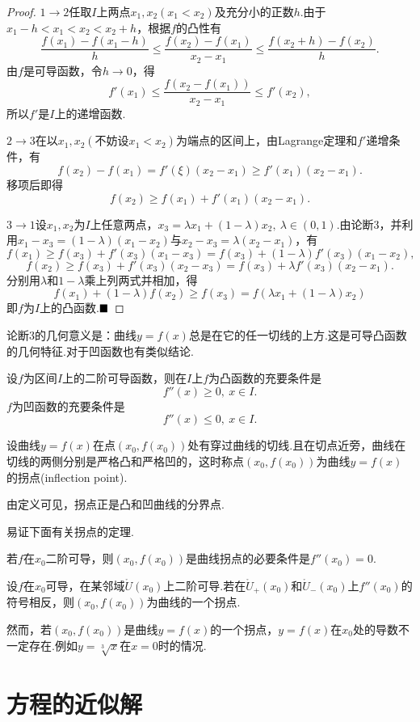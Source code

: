 \begin{proof}
	$1\to 2$\qquad 任取$I$上两点$x_1,x_2(x_1<x_2)$及充分小的正数$h$.由于$x_1-h<x_1<x_2<x_2+h$，根据$f$的凸性有
	$$\frac{f(x_1)-f(x_1-h)}{h}\leqslant\frac{f(x_2)-f(x_1)}{x_2-x_1}\leqslant\frac{f(x_2+h)-f(x_2)}{h}.$$
	由$f$是可导函数，令$h\to 0$，得
	$$f'(x_1)\leq\frac{f(x_2-f(x_1))}{x_2-x_1}\leqslant f'(x_2),$$
	所以$f'$是$I$上的递增函数.
	
	$2\to 3$\qquad 在以$x_1,x_2(\text{不妨设}x_1<x_2)$为端点的区间上，由Lagrange定理和$f'$递增条件，有
	$$f(x_2)-f(x_1)=f'(\xi)(x_2-x_1)\geqslant f'(x_1)(x_2-x_1).$$
	移项后即得
	$$f(x_2)\geqslant f(x_1)+f'(x_1)(x_2-x_1).$$
	
	$3\to 1$\qquad 设$x_1,x_2$为$I$上任意两点，$x_3=\lambda x_1+(1-\lambda)x_2,\ \lambda\in(0,1)$.由论断3，并利用$x_1-x_3=(1-\lambda)(x_1-x_2)$与$x_2-x_3=\lambda(x_2-x_1)$，有
	$$f(x_1)\geqslant f(x_3)+f'(x_3)(x_1-x_3)=f(x_3)+(1-\lambda)f'(x_3)(x_1-x_2),$$
	$$f(x_2)\geqslant f(x_3)+f'(x_3)(x_2-x_3)=f(x_3)+\lambda f'(x_3)(x_2-x_1).$$
	分别用$\lambda$和$1-\lambda$乘上列两式并相加，得
	$$f(x_1)+(1-\lambda)f(x_2)\geqslant f(x_3)=f(\lambda x_1+(1-\lambda)x_2)$$
	即$f$为$I$上的凸函数.$\hfill\blacksquare$
\end{proof}
\begin{remark}
	论断3的几何意义是：曲线$y=f(x)$总是在它的任一切线的上方.这是可导凸函数的几何特征.对于凹函数也有类似结论.
\end{remark}
\begin{corollary}
	设$f$为区间$I$上的二阶可导函数，则在$I$上$f$为凸函数的充要条件是
	$$f''(x)\geqslant 0,\ x\in I.$$
	$f$为凹函数的充要条件是
	$$f''(x)\leqslant 0,\ x\in I.$$
\end{corollary}
\begin{definition}[拐点]
	设曲线$y=f(x)$在点$(x_0,f(x_0))$处有穿过曲线的切线.且在切点近旁，曲线在切线的两侧分别是严格凸和严格凹的，这时称点$(x_0,f(x_0))$为曲线$y=f(x)$的{\heiti 拐点}(inflection point).
\end{definition}
由定义可见，拐点正是凸和凹曲线的分界点.

易证下面有关拐点的定理.
\begin{theorem}
	若$f$在$x_0$二阶可导，则$(x_0,f(x_0))$是曲线拐点的必要条件是$f''(x_0)=0$.
\end{theorem}
\begin{theorem}
	设$f$在$x_0$可导，在某邻域$\mathring{U}(x_0)$上二阶可导.若在$\mathring{U}_+(x_0)$和$\mathring{U}_-(x_0)$上$f''(x_0)$的符号相反，则$(x_0,f(x_0))$为曲线的一个拐点.
\end{theorem}
然而，若$(x_0,f(x_0))$是曲线$y=f(x)$的一个拐点，$y=f(x)$在$x_0$处的导数不一定存在.例如$y=\sqrt[3]{x}$在$x=0$时的情况.
\section{方程的近似解}
